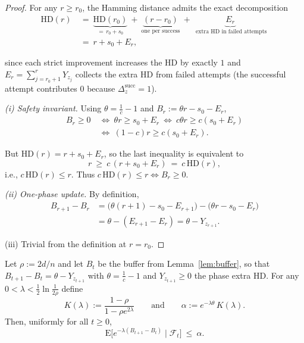 \documentclass[lettersize,journal]{IEEEtran}
\newcommand{\EE}{\text{E}}
\newcommand{\HD}{\text{HD}}
\begin{document}
\begin{proof}
	For any $r\ge r_0$, the Hamming distance admits the exact decomposition
	\begin{align*}
	\HD(r)\ &=\ \underbrace{\HD(r_0)}_{=\,r_0+s_0}\ +\ \underbrace{(r-r_0)}_{\text{one per success}}\ +\ \underbrace{E_r}_{\text{ extra HD in failed attempts}}
	\ \\&=\ r+s_0+E_r,		
	\end{align*}
	
	since each strict improvement increases the HD by exactly $1$ and $E_r=\sum_{j=r_0+1}^r Y_{z_j}$ collects the extra HD from failed attempts (the successful attempt contributes $0$ because $\Delta_z^{\mathrm{succ}}=1$).
	
	\smallskip
	\emph{(i) Safety invariant.}
	Using $\theta=\tfrac{1}{c}-1$ and $B_r:=\theta r - s_0 - E_r$,
	\begin{align*}
	B_r\ge 0
	\ &\Longleftrightarrow\
	\theta r \ge s_0+E_r
	\ \Longleftrightarrow\
	c\theta r \ge c(s_0+E_r)
	\\ &\Longleftrightarrow\
	(1-c)r \ge c(s_0+E_r).	
	\end{align*}
	
	
	But $\HD(r)=r+s_0+E_r$, so the last inequality is equivalent to
	\[
	r \ \ge\ c\,(r+s_0+E_r)\ =\ c\,\HD(r),
	\]
	i.e., $c\,\HD(r)\le r$. Thus $c\,\HD(r)\le r \iff B_r\ge 0$.
	
	\smallskip
	\emph{(ii) One-phase update.}
	By definition,
	\begin{align*}
	B_{r+1}-B_r
	&= \bigl(\theta(r+1)-s_0-E_{r+1}\bigr) - \bigl(\theta r - s_0 - E_r\bigr)
	\\&= \theta - (E_{r+1}-E_r)
	= \theta - Y_{z_{r+1}}.
	\end{align*}
	
	
	
	\smallskip
(iii) Trivial from the definition at $r=r_0$.
\end{proof}

\begin{lemma}\label{lem:drift-envelope-global}
	Let $\rho:=2d/n$ and let $B_t$ be the buffer from Lemma~\ref{lem:buffer}, so that
	$B_{t+1}-B_t=\theta-Y_{z_{t+1}}$ with $\theta=\tfrac{1}{c}-1$ and $Y_{z_{t+1}}\ge 0$ the phase extra HD.
	For any $0<\lambda<\tfrac12\ln\!\tfrac{1}{2\rho}$ define
	\[
	K(\lambda):=\frac{1-\rho}{1-\rho e^{2\lambda}}
	\qquad\text{and}\qquad
	\alpha:=e^{-\lambda\theta}\,K(\lambda).
	\]
	Then, uniformly for all $t\ge 0$,
	\[
	\EE\!\big[e^{-\lambda(B_{t+1}-B_t)}\mid \mathcal F_t\big]\ \le\ \alpha.
	\]
\end{lemma}
\end{document}
